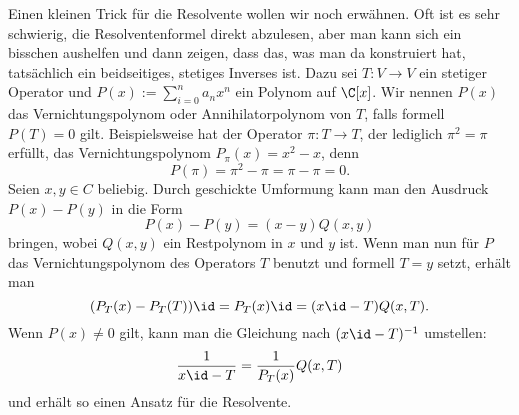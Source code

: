 Einen kleinen Trick für die Resolvente wollen wir noch erwähnen. Oft ist es sehr schwierig, die Resolventenformel direkt abzulesen, aber man kann sich  ein bisschen aushelfen und dann zeigen, dass das, was man da konstruiert hat, tatsächlich ein beidseitiges, stetiges Inverses ist. Dazu sei $T: V \to V$ ein stetiger Operator und $P(x):= \sum_{i=0}^n a_n x^n$ ein Polynom auf $\C[x]$. Wir nennen $P(x)$ das Vernichtungspolynom oder Annihilatorpolynom von $T$, falls formell $P(T)=0$ gilt. Beispielsweise hat der Operator $\pi: T \to T$, der lediglich $\pi^2=\pi$ erfüllt, das Vernichtungspolynom $P_\pi(x)=x^2-x$, denn
\[
	P(\pi) = \pi^2 - \pi = \pi - \pi = 0.
\]
Seien $x,y \in C$ beliebig. Durch geschickte Umformung kann man den Ausdruck $P(x) - P(y)$ in die Form
\[
	P(x) - P(y) = (x-y) Q(x,y)
\]
bringen, wobei $Q(x,y)$ ein Restpolynom in $x$ und $y$ ist. Wenn man nun für $P$ das Vernichtungspolynom des Operators $T$ benutzt und formell $T=y$ setzt, erhält man
\[
	(P_T(x) - P_T(T))\id = P_T(x)\id = (x \id - T) Q(x,T).
\]
Wenn $P(x)\neq 0$ gilt, kann man die Gleichung nach $(x \id - T)^{-1}$ umstellen:
\[
	\frac{1}{x \id - T} = \frac{1}{P_T(x)}Q(x,T)
\]
und erhält so einen Ansatz für die Resolvente.
